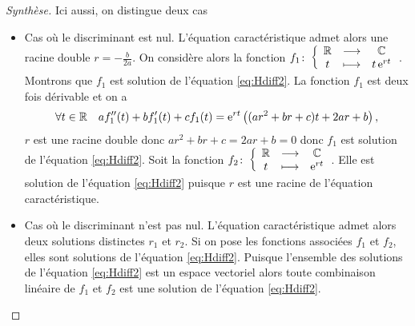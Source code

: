 \begin{proof}[Synthèse]
  Ici aussi, on distingue deux cas
\begin{itemize}
\item Cas où le discriminant est nul. L'équation caractéristique admet alors une racine double $r=-\frac{b}{2a}$. On considère alors la fonction $f_1\colon \left\{\begin{array}{ccc} \mathbb{R} & \longrightarrow &\mathbb{C}\\ t & \longmapsto & t\operatorname{e}^{rt} \end{array} \right.$. Montrons que $f_1$ est solution de l'équation \eqref{eq:Hdiff2}. La fonction $f_1$ est deux fois dérivable et on a 
  \begin{equation}
    \forall t \in \mathbb{R}  \quad af_1''(t)+bf_1'(t)+cf_1(t)=\operatorname{e}^{rt} \left( (ar^2+br+c)t + 2ar+b \right),
  \end{equation}
$r$ est une racine double donc $ar^2+br+c=2ar+b=0$ donc $f_1$ est solution de l'équation \eqref{eq:Hdiff2}. Soit la fonction $f_2\colon \left\{\begin{array}{ccc} \mathbb{R} & \longrightarrow &\mathbb{C}\\ t & \longmapsto & \operatorname{e}^{rt} \end{array} \right.$. Elle est solution de l'équation \eqref{eq:Hdiff2} puisque $r$ est une racine de l'équation caractéristique.
\item Cas où le discriminant n'est pas nul. L'équation caractéristique admet alors deux solutions distinctes $r_1$ et $r_2$. Si on pose les fonctions associées $f_1$ et $f_2$, elles sont solutions de l'équation \eqref{eq:Hdiff2}. Puisque l'ensemble des solutions de l'équation \eqref{eq:Hdiff2} est un espace vectoriel alors toute combinaison linéaire de $f_1$ et $f_2$ est une solution de l'équation \eqref{eq:Hdiff2}.
\end{itemize}
\end{proof}
%
